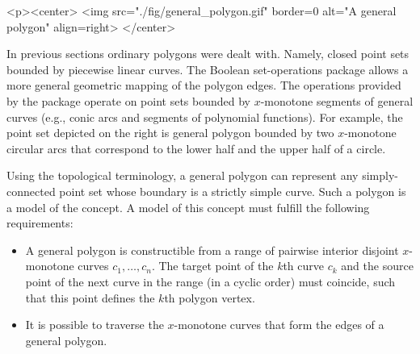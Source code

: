 \lcTex{%
  \setlength{\widthRight}{1.4cm}
  \setlength{\widthLeft}{\widthLineReal}
  \addtolength{\widthLeft}{-\widthRight}
  \begin{minipage}{\widthLeft}
}
\label{fig:general_polygon}
\begin{ccHtmlOnly}
  <p><center>
    <img src="./fig/general_polygon.gif" border=0 alt="A general polygon" align=right>
  </center>
\end{ccHtmlOnly}
In previous sections ordinary polygons were dealt with. Namely, closed
point sets bounded by piecewise linear curves. The Boolean
set-operations package allows a more general geometric mapping of the
polygon edges. The operations provided by the package operate on point
sets bounded by $x$-monotone segments of general curves (e.g., conic
arcs and segments of polynomial functions). For example, the point set
depicted on the right is general polygon bounded by two $x$-monotone
circular arcs that correspond to the lower half and the upper half of
a circle.

Using the topological terminology, a general polygon can represent any
simply-connected point set whose boundary is a strictly simple curve.
Such a polygon is a model of the  concept. A model
of this concept must fulfill the following requirements:
\begin{itemize}
\item A general polygon is constructible from a range of pairwise
interior disjoint $x$-monotone curves $c_1, \ldots, c_n$. The target
point of the $k$th curve $c_k$ and the source point of the next curve
in the range (in a cyclic order) must coincide, such that this point
defines the $k$th polygon vertex. 
\item It is possible to traverse the $x$-monotone curves that form the
edges of a general polygon.
\end{itemize}

